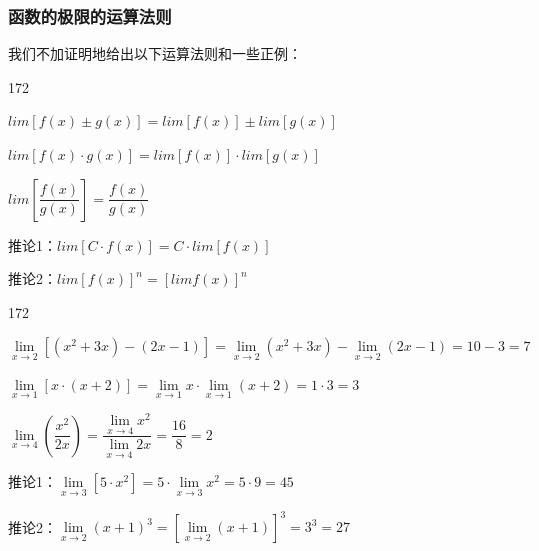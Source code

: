 \subsubsection*{函数的极限的运算法则}
我们不加证明地给出以下运算法则和一些正例：
\begin{dingautolist}{172}
    \item $lim[f(x) \pm g(x)] = lim[f(x)] \pm lim[g(x)]$
    \item $lim[f(x) \cdot g(x)] = lim[f(x)] \cdot lim[g(x)]$
    \item $lim\left[\dfrac{f(x)}{g(x)}\right] = \dfrac{f(x)}{g(x)}$
    \item 推论1：$lim[C \cdot f(x)] = C \cdot lim[f(x)]$
    \item 推论2：$lim[f(x)]^n = [limf(x)]^n$
\end{dingautolist}
\begin{example}    
    \begin{dingautolist}{172}
        \item $\lim\limits_{x \to 2} [(x^2 + 3x) - (2x - 1)] = \lim\limits_{x \to 2} (x^2 + 3x) - \lim\limits_{x \to 2} (2x - 1) = 10 - 3 = 7$

        \item $\lim\limits_{x \to 1} [x \cdot (x + 2)] = \lim\limits_{x \to 1} x \cdot \lim\limits_{x \to 1} (x + 2) = 1 \cdot 3 = 3$
        
        \item $\lim\limits_{x \to 4} \left(\dfrac{x^2}{2x}\right) = \dfrac{\lim\limits_{x \to 4} x^2}{\lim\limits_{x \to 4} 2x} = \dfrac{16}{8} = 2$
        
        \item 推论1：$\lim\limits_{x \to 3} [5 \cdot x^2] = 5 \cdot \lim\limits_{x \to 3} x^2 = 5 \cdot 9 = 45$
        
        \item 推论2：$\lim\limits_{x \to 2} (x + 1)^3 = \left[\lim\limits_{x \to 2} (x + 1)\right]^3 = 3^3 = 27$
    \end{dingautolist}
\end{example}
